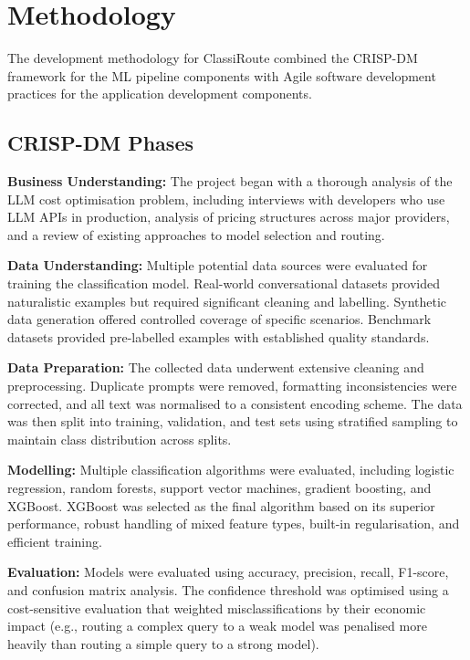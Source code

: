 \documentclass[oneside,12pt,a4paper]{report}
\begin{document}
\section{Methodology}

The development methodology for ClassiRoute combined the CRISP-DM framework for the ML pipeline components with Agile software development practices for the application development components.

\subsection{CRISP-DM Phases}

\textbf{Business Understanding:} The project began with a thorough analysis of the LLM cost optimisation problem, including interviews with developers who use LLM APIs in production, analysis of pricing structures across major providers, and a review of existing approaches to model selection and routing.

\textbf{Data Understanding:} Multiple potential data sources were evaluated for training the classification model. Real-world conversational datasets provided naturalistic examples but required significant cleaning and labelling. Synthetic data generation offered controlled coverage of specific scenarios. Benchmark datasets provided pre-labelled examples with established quality standards.

\textbf{Data Preparation:} The collected data underwent extensive cleaning and preprocessing. Duplicate prompts were removed, formatting inconsistencies were corrected, and all text was normalised to a consistent encoding scheme. The data was then split into training, validation, and test sets using stratified sampling to maintain class distribution across splits.

\textbf{Modelling:} Multiple classification algorithms were evaluated, including logistic regression, random forests, support vector machines, gradient boosting, and XGBoost. XGBoost was selected as the final algorithm based on its superior performance, robust handling of mixed feature types, built-in regularisation, and efficient training.

\textbf{Evaluation:} Models were evaluated using accuracy, precision, recall, F1-score, and confusion matrix analysis. The confidence threshold was optimised using a cost-sensitive evaluation that weighted misclassifications by their economic impact (e.g., routing a complex query to a weak model was penalised more heavily than routing a simple query to a strong model).
\end{document}
